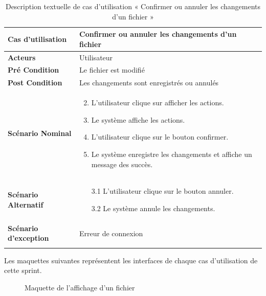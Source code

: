 \begin{longtable}{|p{5cm}|p{10cm}|}
\hline
\textbf{Cas d'utilisation}&Confirmer ou annuler les changements d'un fichier\\
\hline
\textbf{Acteurs}&Utilisateur\\
\hline
\textbf{Pré Condition}&Le fichier est modifié\\
\hline
\textbf{Post Condition}&Les changements sont enregistrés ou annulés\\
\hline
\textbf{Scénario Nominal}&
\vspace{-\baselineskip}
\begin{enumerate}
    \setcounter{enumi}{1}
    \item L'utilisateur clique sur afficher les actions.
    \item Le système affiche les actions.
    \item L'utilisateur clique sur le bouton confirmer.
    \item Le système enregistre les changements et affiche un message des succès.
\end{enumerate}\\
\hline
\textbf{Scénario Alternatif}&
\vspace{-\baselineskip}
\begin{enumerate}
    \item [3.1]L'utilisateur clique sur le bouton annuler.
    \item [3.2]Le système annule les changements.
\end{enumerate}\\
\hline
\textbf{Scénario d'exception}&Erreur de connexion\\
\hline
\caption{Description textuelle de cas d'utilisation « Confirmer ou annuler les changements d'un fichier »}
\label{tab:description-textuelle-de-cas-d-utilisation-confirmer-ou-annuler-les-changements-d-un-fichier}
\end{longtable}


Les maquettes suivantes représentent les interfaces de chaque cas d'utilisation de cette sprint. \\

\begin{figure}[H]
  \centering
  \caption{Maquette de l'affichage d'un fichier}
  \label{fig:design_file_preview}
\end{figure}

